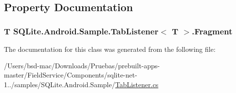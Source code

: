 \subsection{Property Documentation}
\hypertarget{class_s_q_lite_1_1_android_1_1_sample_1_1_tab_listener_3_01_t_01_4_a49819f987c20a40b2b88f101fd537ada}{
\subsubsection[{Fragment}]{\setlength{\rightskip}{0pt plus 5cm}T S\+Q\+Lite.\+Android.\+Sample.\+Tab\+Listener$<$ T $>$.Fragment\hspace{0.3cm}{\ttfamily [get]}}}\label{class_s_q_lite_1_1_android_1_1_sample_1_1_tab_listener_3_01_t_01_4_a49819f987c20a40b2b88f101fd537ada}


The documentation for this class was generated from the following file\+:\begin{DoxyCompactItemize}
\item 
/\+Users/bsd-\/mac/\+Downloads/\+Pruebas/prebuilt-\/apps-\/master/\+Field\+Service/\+Components/sqlite-\/net-\/1../samples/\+S\+Q\+Lite.\+Android.\+Sample/\hyperlink{_tab_listener_8cs}{Tab\+Listener.\+cs}\end{DoxyCompactItemize}
